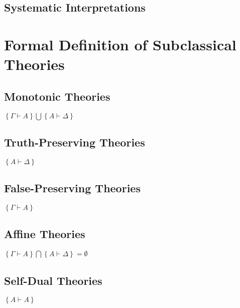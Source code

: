 \documentclass{article}
\begin{document}
\begin{center}
		\subsection{Systematic Interpretations}
	\section{Formal Definition of Subclassical Theories}
		\subsection{Monotonic Theories}
		$\left\{ Γ ⊢ A \right\} \bigcup \left\{ A ⊢ Δ \right\}$
		\subsection{Truth-Preserving Theories}
		$\left\{ A ⊢ Δ \right\}$
		\subsection{False-Preserving Theories}
		$\left\{ Γ ⊢ A \right\}$
		\subsection{Affine Theories}
		$\left\{ Γ ⊢ A \right\} \bigcap \left\{ A ⊢ Δ \right\}=\emptyset$
		\subsection{Self-Dual Theories}
		$\left\{ A ⊢ A \right\}$

\end{center}
\end{document}
